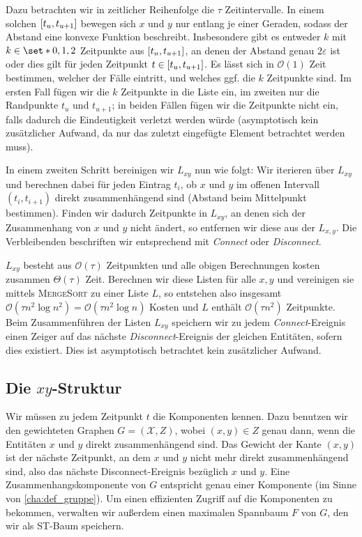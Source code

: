 Dazu betrachten wir in zeitlicher Reihenfolge die $\tau$ Zeitintervalle.
In einem solchen $\benbrace*{t_u,t_{u+1}}$ bewegen sich $x$ und $y$ nur entlang je einer Geraden, sodass der Abstand eine konvexe Funktion beschreibt.
Insbesondere gibt es entweder $k$ mit $k \in \set*{0,1,2}$ Zeitpunkte aus $\benbrace*{t_u,t_{u+1}}$, an denen der Abstand genau $2 \varepsilon$ ist oder dies gilt für jeden Zeitpunkt $t \in \benbrace*{t_u,t_{u+1}}$.
Es lässt sich in $\mathcal{O}(1)$ Zeit bestimmen, welcher der Fälle eintritt, und welches ggf. die $k$ Zeitpunkte sind.
Im ersten Fall fügen wir die $k$ Zeitpunkte in die Liste ein, im zweiten nur die Randpunkte $t_u$ und $t_{u+1}$; in beiden Fällen fügen wir die Zeitpunkte nicht ein, falls dadurch die Eindeutigkeit verletzt werden würde (asymptotisch kein zusätzlicher Aufwand, da nur das zuletzt eingefügte Element betrachtet werden muss).

In einem zweiten Schritt bereinigen wir $L_{xy}$ nun wie folgt: Wir iterieren über $L_{xy}$ und berechnen dabei für jeden Eintrag $t_i$, ob $x$ und $y$ im offenen Intervall $(t_i,t_{i+1})$ direkt zusammenhängend sind (Abstand beim Mittelpunkt bestimmen). 
Finden wir dadurch Zeitpunkte in $L_{xy}$, an denen sich der Zusammenhang von $x$ und $y$ nicht ändert, so entfernen wir diese aus der $L_{x,y}$.
Die Verbleibenden beschriften wir entsprechend mit \emph{Connect} oder \emph{Disconnect}.

$L_{xy}$ besteht aus $\mathcal{O}(\tau)$ Zeitpunkten und alle obigen Berechnungen kosten zusammen $\Theta(\tau)$ Zeit.
Berechnen wir diese Listen für alle $x,y$ und vereinigen sie mittels \textsc{MergeSort} zu einer Liste $L$, so entstehen also insgesamt $\mathcal{O}(\tau n^2 \log n^2) = \mathcal{O}(\tau n^2 \log n)$ Kosten und $L$ enthält $\mathcal{O}(\tau n^2)$ Zeitpunkte.
Beim Zusammenführen der Listen $L_{xy}$ speichern wir zu jedem \emph{Connect}-Ereignis einen Zeiger auf das nächste \emph{Disconnect}-Ereignis der gleichen Entitäten, sofern dies existiert.
Dies ist asymptotisch betrachtet kein zusätzlicher Aufwand. 

\subsection{Die $xy$-Struktur} %
\label{sub:xy_struktur}
Wir müssen zu jedem Zeitpunkt $t$ die Komponenten kennen.
Dazu benutzen wir den gewichteten Graphen $G=(\mathcal{X},Z)$, wobei $(x,y) \in Z$ genau dann, wenn die Entitäten $x$ und $y$ direkt zusammenhängend sind.
Das Gewicht der Kante $(x,y)$ ist der nächste Zeitpunkt, an dem $x$ und $y$ nicht mehr direkt zusammenhängend sind, also das nächste Disconnect-Ereignis bezüglich $x$ und $y$.
Eine Zusammenhangskomponente von $G$ entspricht genau einer Komponente (im Sinne von \cref{cha:def_gruppe}).
Um einen effizienten Zugriff auf die Komponenten zu bekommen, verwalten wir außerdem einen maximalen Spannbaum $F$ von $G$, den wir als ST-Baum speichern.

